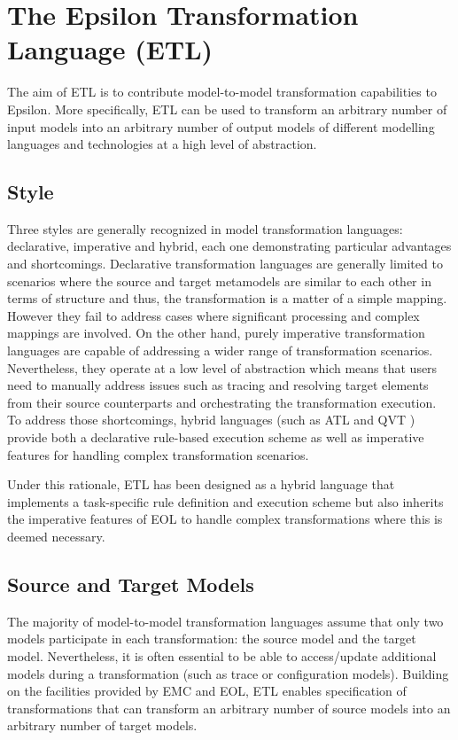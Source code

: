 \chapter{The Epsilon Transformation Language (ETL)}
\label{sec:ETL}

The aim of ETL \cite{ETL} is to contribute model-to-model transformation capabilities to Epsilon. More specifically, ETL can be used to transform an arbitrary number of input models into an arbitrary number of output models of different modelling languages and technologies at a high level of abstraction. 

\section{Style}

Three styles are generally recognized in model transformation languages: declarative, imperative and hybrid, each one demonstrating particular advantages and shortcomings. Declarative transformation languages are generally limited to scenarios where the source and target metamodels are similar to each other in terms of structure and thus, the transformation is a matter of a simple mapping. However they fail to address cases where significant processing and complex mappings are involved. On the other hand, purely imperative transformation languages are capable of addressing a wider range of transformation scenarios. Nevertheless, they operate at a low level of abstraction which means that users need to manually address issues such as tracing and resolving target elements from their source counterparts and orchestrating the transformation execution. To address those shortcomings, hybrid languages (such as ATL \cite{ATL} and QVT \cite{QVT}) provide both a declarative rule-based execution scheme as well as imperative features for handling complex transformation scenarios. 

Under this rationale, ETL has been designed as a hybrid language that implements a task-specific rule definition and execution scheme but also inherits the imperative features of EOL to handle complex transformations where this is deemed necessary.

\section{Source and Target Models}

The majority of model-to-model transformation languages assume that only two models participate in each transformation: the source model and the target model. Nevertheless, it is often essential to be able to access/update additional models during a transformation (such as trace or configuration models). Building on the facilities provided by EMC and EOL, ETL enables specification of transformations that can transform an arbitrary number of source models into an arbitrary number of target models.


